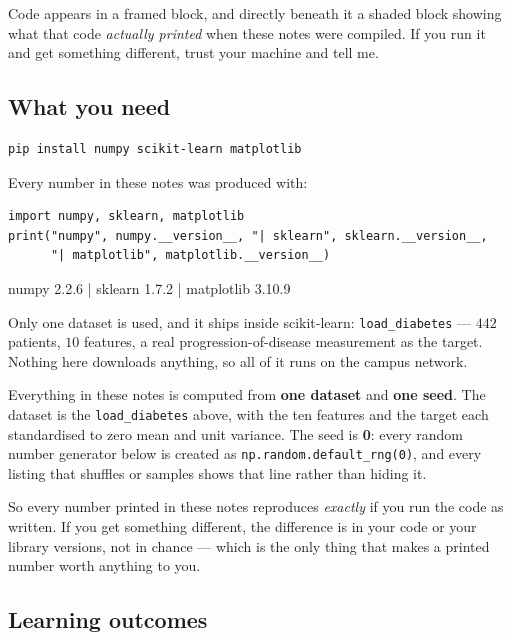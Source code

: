 \documentclass[11pt]{article}
\begin{document}
Code appears in a framed block, and directly beneath it a shaded block showing
what that code \emph{actually printed} when these notes were compiled. If you
run it and get something different, trust your machine and tell me.

\subsection{What you need}

\begin{lstlisting}
pip install numpy scikit-learn matplotlib
\end{lstlisting}

Every number in these notes was produced with:

\begin{lstlisting}
import numpy, sklearn, matplotlib
print("numpy", numpy.__version__, "| sklearn", sklearn.__version__,
      "| matplotlib", matplotlib.__version__)
\end{lstlisting}
\begin{codeout}
numpy 2.2.6 | sklearn 1.7.2 | matplotlib 3.10.9
\end{codeout}

Only one dataset is used, and it ships inside scikit-learn:
\texttt{load\_diabetes} --- $442$ patients, $10$ features, a real
progression-of-disease measurement as the target. Nothing here downloads
anything, so all of it runs on the campus network.

\begin{keyidea}
Everything in these notes is computed from \textbf{one dataset} and
\textbf{one seed}. The dataset is the \texttt{load\_diabetes} above, with the
ten features and the target each standardised to zero mean and unit variance.
The seed is \textbf{0}: every random number generator below is created as
\texttt{np.random.default\_rng(0)}, and every listing that shuffles or samples
shows that line rather than hiding it.

So every number printed in these notes reproduces \emph{exactly} if you run
the code as written. If you get something different, the difference is in your
code or your library versions, not in chance --- which is the only thing that
makes a printed number worth anything to you.
\end{keyidea}

\subsection{Learning outcomes}
\end{document}
